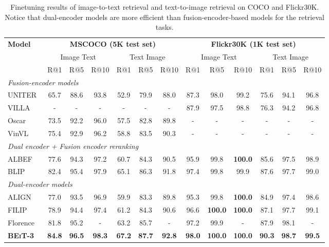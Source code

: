 \documentclass{article}
\newcommand\our{\textsc{BEiT-3}}
\begin{document}
\begin{table*}[t]
\centering
\small
\begin{tabular}{@{}l@{\hskip1pt} @{\hskip1pt}c@{ \hskip1pt} @{\hskip1pt}c@{ \hskip1pt} @{\hskip1pt}c@{ \hskip1pt} @{\hskip1pt}c@{ \hskip1pt} @{\hskip1pt}c@{ \hskip1pt} @{\hskip1pt}c@{ \hskip1pt} | @{ \hskip2pt}c@{ \hskip1pt} @{\hskip1pt}c@{ \hskip1pt} @{\hskip1pt}c@{ \hskip1pt} @{\hskip1pt}c@{ \hskip1pt} @{\hskip1pt}c@{ \hskip1pt} @{\hskip1pt}c@{} }
\toprule
\multirow{3}{*}{\bf Model} & \multicolumn{6}{c}{\bf MSCOCO (5K test set)} & \multicolumn{6}{c}{\bf Flickr30K (1K test set)} \\
 & \multicolumn{3}{c}{Image  Text} & \multicolumn{3}{c}{Text  Image} & \multicolumn{3}{c}{Image  Text} & \multicolumn{3}{c}{Text  Image} \\
 \cmidrule(lr){2-4} \cmidrule(lr){5-7} \cmidrule(lr){8-10} \cmidrule(lr){11-13}
 & R@1 & R@5 & R@10 & R@1 & R@5 & R@10 & R@1 & R@5 & R@10 & R@1 & R@5 & R@10 \\
\midrule
\multicolumn{13}{l}{\textit{Fusion-encoder models}} \\
UNITER~\citep{uniter} & 65.7 & 88.6 & 93.8 & 52.9 & 79.9 & 88.0 & 87.3 & 98.0 & 99.2 & 75.6 & 94.1 & 96.8 \\
VILLA~\citep{villa} & - & - & - & - & - & - & 87.9 & 97.5 & 98.8 & 76.3 & 94.2 & 96.8 \\
Oscar~\citep{oscar} & 73.5 & 92.2 & 96.0 & 57.5 & 82.8 & 89.8 & - & - & - & - & - & - \\
VinVL~\citep{vinvl} & 75.4 & 92.9 & 96.2 & 58.8 & 83.5 & 90.3 & - & - & - & - & - & - \\
\midrule
\multicolumn{13}{l}{\textit{Dual encoder + Fusion encoder reranking}} \\
ALBEF~\citep{albef} & 77.6 & 94.3 & 97.2 & 60.7 & 84.3 & 90.5 & 95.9 & 99.8 & \bf 100.0 & 85.6 & 97.5 & 98.9 \\
BLIP~\citep{blip} & 82.4 & 95.4 & 97.9 & 65.1 & 86.3 & 91.8 & 97.4 & 99.8 & 99.9 & 87.6 & 97.7 & 99.0 \\
\midrule
\multicolumn{13}{l}{\textit{Dual-encoder models}} \\
ALIGN~\citep{align} & 77.0 & 93.5 & 96.9 & 59.9 & 83.3 & 89.8 & 95.3 & 99.8 & \bf 100.0 & 84.9 & 97.4 & 98.6 \\
FILIP~\citep{filip} & 78.9 & 94.4 & 97.4 & 61.2 & 84.3 & 90.6 & 96.6 & \bf 100.0 & \bf 100.0 & 87.1 & 97.7 & 99.1 \\
Florence~\citep{florence} & 81.8 & 95.2 & - & 63.2 & 85.7 & - & 97.2 & 99.9 & - & 87.9 & 98.1 & - \\
\bf \our{} & \bf 84.8 & \bf 96.5 & \bf 98.3 & \bf 67.2 & \bf 87.7 & \bf 92.8 & \bf 98.0 & \bf 100.0 & \bf 100.0 & \bf 90.3 & \bf 98.7 & \bf 99.5 \\
\bottomrule
\end{tabular}
\caption{
Finetuning results of image-to-text retrieval and text-to-image retrieval on COCO and Flickr30K.
Notice that dual-encoder models are more efficient than fusion-encoder-based models for the retrieval tasks.
}
\label{tbl:results:finetuned_retrieval}
\end{table*}
\end{document}
